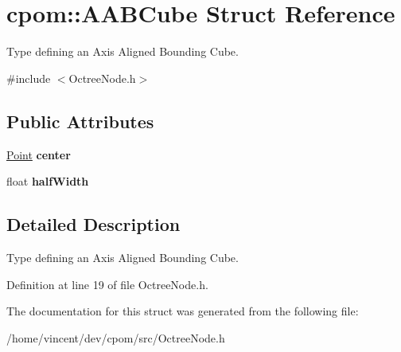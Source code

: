 \hypertarget{structcpom_1_1_a_a_b_cube}{}\section{cpom\+:\+:A\+A\+B\+Cube Struct Reference}
\label{structcpom_1_1_a_a_b_cube}


Type defining an Axis Aligned Bounding Cube.  




{\ttfamily \#include $<$Octree\+Node.\+h$>$}

\subsection*{Public Attributes}
\begin{DoxyCompactItemize}
\item 
\hyperlink{structcpom_1_1_float3}{Point} {\bfseries center}\hypertarget{structcpom_1_1_a_a_b_cube_a2f9cc0d64f52bb136bb4642baa631f72}{}\label{structcpom_1_1_a_a_b_cube_a2f9cc0d64f52bb136bb4642baa631f72}

\item 
float {\bfseries half\+Width}\hypertarget{structcpom_1_1_a_a_b_cube_a3c57a9f146863be00e461bc47020fce2}{}\label{structcpom_1_1_a_a_b_cube_a3c57a9f146863be00e461bc47020fce2}

\end{DoxyCompactItemize}


\subsection{Detailed Description}
Type defining an Axis Aligned Bounding Cube. 

Definition at line 19 of file Octree\+Node.\+h.



The documentation for this struct was generated from the following file\+:\begin{DoxyCompactItemize}
\item 
/home/vincent/dev/cpom/src/Octree\+Node.\+h\end{DoxyCompactItemize}
